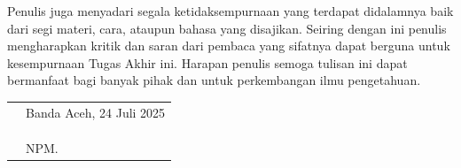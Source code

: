 
Penulis juga menyadari segala ketidaksempurnaan yang terdapat didalamnya baik dari segi materi, cara, ataupun bahasa yang disajikan. Seiring dengan ini penulis mengharapkan kritik dan saran dari pembaca yang sifatnya dapat berguna untuk kesempurnaan Tugas Akhir ini. Harapan penulis semoga tulisan ini dapat bermanfaat bagi banyak pihak dan untuk perkembangan ilmu pengetahuan.

\vspace{1cm}


\begin{tabular}{p{7.5cm}l}
	&Banda Aceh, 24 Juli 2025\\
	&\\
	&\\
	&\multirow{1.5}{7.5cm}{\underline{\@fullname}} \\ 
	&NPM. \@idnum \\
\end{tabular}
\makeatother
